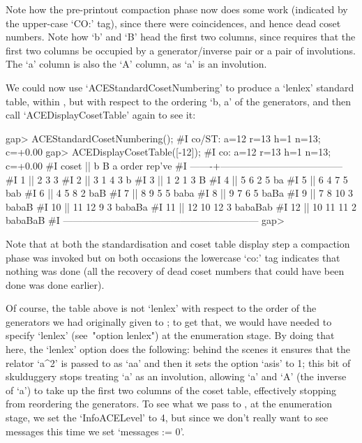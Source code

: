 Note  how  the  pre-printout  compaction  phase  now  does  some  work
(indicated  by  the  upper-case   `CO:'   tag),   since   there   were
coincidences, and hence dead coset numbers. Note how `b' and `B'  head
the first two columns,  since  {\ACE}  requires  that  the  first  two
columns  be  occupied  by  a  generator/inverse  pair  or  a  pair  of
involutions. The `a' column is also the  `A'  column,  as  `a'  is  an
involution.

We could now use `ACEStandardCosetNumbering'  to  produce  a  `lenlex'
standard table, within {\ACE}, but with respect to the ordering `b, a'
of the generators, and then call `ACEDisplayCosetTable' again  to  see
it:

\beginexample
gap> ACEStandardCosetNumbering();
#I  co/ST: a=12 r=13 h=1 n=13; c=+0.00
gap> ACEDisplayCosetTable([-12]);
#I  co: a=12 r=13 h=1 n=13; c=+0.00
#I   coset ||      b      B      a   order   rep've
#I  -------+--------------------------------------
#I       1 ||      2      3      3
#I       2 ||      3      1      4       3   b
#I       3 ||      1      2      1       3   B
#I       4 ||      5      6      2       5   ba
#I       5 ||      6      4      7       5   bab
#I       6 ||      4      5      8       2   baB
#I       7 ||      8      9      5       5   baba
#I       8 ||      9      7      6       5   baBa
#I       9 ||      7      8     10       3   babaB
#I      10 ||     11     12      9       3   babaBa
#I      11 ||     12     10     12       3   babaBab
#I      12 ||     10     11     11       2   babaBaB
#I  ------------------------------------------------------------
gap>
\endexample

Note that at both the standardisation and coset table display  step  a
compaction phase was invoked but on both occasions the lowercase `co:'
tag indicates that nothing was done (all the recovery  of  dead  coset
numbers that could have been done was done earlier).

Of course, the table above is not `lenlex' with respect to  the  order
of the generators we had originally given to {\ACE}; to get  that,  we
would have needed to specify `lenlex'  (see~"option  lenlex")  at  the
enumeration stage. By doing that here, the `lenlex'  option  does  the
following: behind the scenes it ensures  that  the  relator  `a^2'  is
passed to {\ACE} as `aa' and then it sets the option `asis' to 1; this
bit of  skulduggery  stops  {\ACE}  treating  `a'  as  an  involution,
allowing `a' and `A' (the inverse of `a') to take  up  the  first  two
columns  of  the  coset  table,  effectively  stopping   {\ACE}   from
reordering the generators. To see what  we  pass  to  {\ACE},  at  the
enumeration stage, we set the `InfoACELevel' to 4, but since we  don't
really want to see messages this time we set `messages := 0'.


